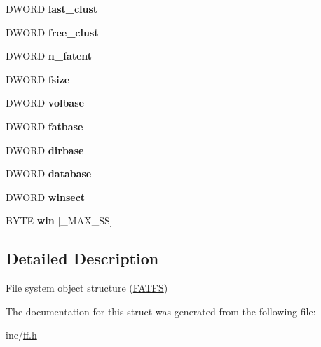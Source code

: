 \begin{DoxyCompactItemize}
\item 
D\+W\+O\+RD {\bfseries last\+\_\+clust}\hypertarget{structFATFS_ad315def289218e26ab78ff90fde700d1}{}\label{structFATFS_ad315def289218e26ab78ff90fde700d1}

\item 
D\+W\+O\+RD {\bfseries free\+\_\+clust}\hypertarget{structFATFS_a5fb49e6ac511bd97eaffdd636d0e4165}{}\label{structFATFS_a5fb49e6ac511bd97eaffdd636d0e4165}

\item 
D\+W\+O\+RD {\bfseries n\+\_\+fatent}\hypertarget{structFATFS_a8da50eeba6469bc20d60ca0cf9a1307c}{}\label{structFATFS_a8da50eeba6469bc20d60ca0cf9a1307c}

\item 
D\+W\+O\+RD {\bfseries fsize}\hypertarget{structFATFS_a53e9560659f14e66f306c2c444198bf3}{}\label{structFATFS_a53e9560659f14e66f306c2c444198bf3}

\item 
D\+W\+O\+RD {\bfseries volbase}\hypertarget{structFATFS_a8f0ca578755749d204f59dc83f1a7649}{}\label{structFATFS_a8f0ca578755749d204f59dc83f1a7649}

\item 
D\+W\+O\+RD {\bfseries fatbase}\hypertarget{structFATFS_a848fba02c4aabe02ef2984e578f33d64}{}\label{structFATFS_a848fba02c4aabe02ef2984e578f33d64}

\item 
D\+W\+O\+RD {\bfseries dirbase}\hypertarget{structFATFS_a3f72fd998dbcce4652a85a81fe944bc4}{}\label{structFATFS_a3f72fd998dbcce4652a85a81fe944bc4}

\item 
D\+W\+O\+RD {\bfseries database}\hypertarget{structFATFS_a5b6c0bc2e9fd2ae8ef714210a74a2d5d}{}\label{structFATFS_a5b6c0bc2e9fd2ae8ef714210a74a2d5d}

\item 
D\+W\+O\+RD {\bfseries winsect}\hypertarget{structFATFS_ac60e69c00e6bf7c25febfbac4dc1476b}{}\label{structFATFS_ac60e69c00e6bf7c25febfbac4dc1476b}

\item 
B\+Y\+TE {\bfseries win} \mbox{[}\+\_\+\+M\+A\+X\+\_\+\+SS\mbox{]}\hypertarget{structFATFS_a7cc35a593465e727ab87723c14610644}{}\label{structFATFS_a7cc35a593465e727ab87723c14610644}

\end{DoxyCompactItemize}


\subsection{Detailed Description}
File system object structure (\hyperlink{structFATFS}{F\+A\+T\+FS}) 

The documentation for this struct was generated from the following file\+:\begin{DoxyCompactItemize}
\item 
inc/\hyperlink{ff_8h}{ff.\+h}\end{DoxyCompactItemize}
